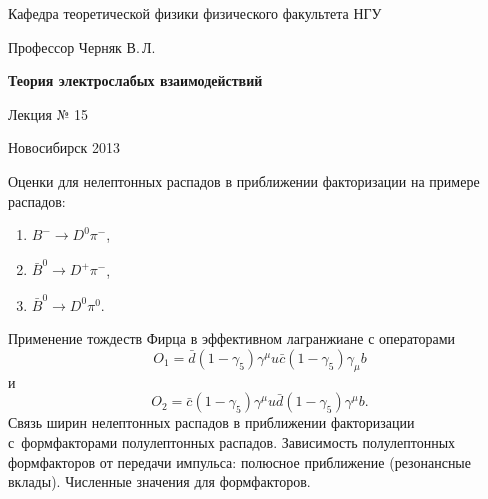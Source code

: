 \documentclass[12pt,pagesize,paper=landscape,paper=192mm:108mm]{scrbook}
\begin{document}
\begin{titlepage}
\begin{center}
    Кафедра теоретической физики физического факультета НГУ
    \medskip

    \Large
    Профессор Черняк В.\,Л.
    \bigskip

    \huge
    \textbf{Теория электрослабых взаимодействий}
    \bigskip

    \Large
    Лекция № 15
    \vfill

    \vfill

\normalsize    Новосибирск 2013
  \smallskip

  \ccbysa
  \end{center}
\end{titlepage}
\newpage

\vspace*{-1em}
\begin{center}
 \vfill
  \begin{minipage}{0.66\linewidth}
    Оценки для нелептонных распадов в приближении факторизации на
    примере распадов:
    \begin{enumerate}
    \item $B^-\to D^0\pi^-$,
    \item $\bar{B}^0\to D^+\pi^-$,
    \item $\bar{B}^0\to D^0\pi^0$.
    \end{enumerate}

    Применение тождеств Фирца в эффективном лагранжиане с операторами
    \[O_1=\bar{d}\left(1-\gamma_5\right)\gamma^{\mu}u\bar{c}\left(1-\gamma_5\right)\gamma_{\mu}b\]
    и
    \[O_2=\bar{c}\left(1-\gamma_5\right)\gamma^{\mu}u\bar{d}\left(1-\gamma_5\right)\gamma^{\mu}b.\]
    Связь ширин нелептонных распадов в приближении факторизации
    с~формфакторами полулептонных распадов.  Зависимость полулептонных
    формфакторов от передачи импульса: полюсное приближение
    (резонансные вклады). Численные значения для формфакторов.
  \end{minipage}
  \vfill

\end{center}
\end{document}
